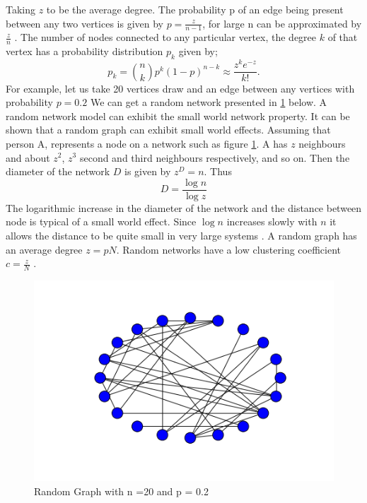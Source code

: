 Taking $z$ to be the average degree. The probability p of an edge being present between any two vertices is given by $p = \frac{z}{n-1}$, for large n can be approximated by $\frac{z}{n}$ \citep{newman2002random}. The number of nodes connected to any particular vertex, the degree $k$ of that vertex has a probability distribution $p_k$ given by;
 \begin{equation}
 p_k = \binom{n}{k} p^k (1-p)^{n-k} \approx \frac{z^k e^{-z}}{k!}.
 \end{equation}
    For example, let us take 20 vertices draw and an edge between any  vertices with probability $p = 0.2$ We can get a random network presented in \ref{fig:3.1} below. A random network model can exhibit the small world network property.  
  It can be shown that a random graph can exhibit small world effects. Assuming that person A, represents a node on a network such as figure \ref{fig:3.1}. A has $z$ neighbours and about $z^2$, $z^3$ second and third neighbours respectively, and so on. Then the diameter of the network $D$ is given by $z^D = n$. Thus
   \begin{equation*}
D = \frac{\log n}{\log z} 
\end{equation*}
    The logarithmic increase in the diameter of the network and the distance between node is typical of a small world effect. Since $\log n$ increases slowly with $n$ it allows the distance to be quite small in very large systems \citep{newman2000models}.
    A random graph  has an average degree $z= pN$. Random networks have a low clustering coefficient $ c = \frac{z}{N}$ \citep{newman2003structure}.
   \begin{figure}[h!]
   \caption{Random Graph with n =20 and p = 0.2}
   \label{fig:3.1}
   \centering
   \includegraphics[scale=0.5]{images/randomgraph.png} 
   \end{figure}
   
